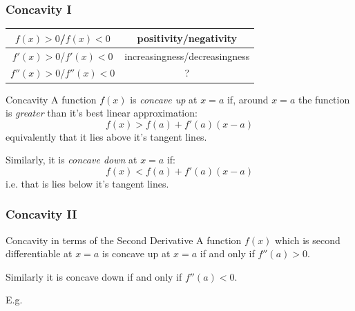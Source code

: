 \documentclass{ltx-talk}
\begin{document}
\begin{frame}
  \frametitle{Concavity I}
  
  \begin{center}
    \begin{tabular}{c|c}
      $f(x) > 0$/$f(x) < 0$ & positivity/negativity \pause \\
      \hline
      $f'(x) > 0$/$f'(x) < 0$ & increasingness/decreasingness \pause \\
      \hline
      $f''(x) > 0$/$f''(x) < 0$ & ?
    \end{tabular}
  \end{center}
    \begin{block}{Concavity}
      A function $f(x)$ is \textit{concave up} at $x = a$ if,
      around $x = a$ \pause the function is \textit{greater} than it's 
      best linear approximation: \pause
      \begin{equation}
        f(x) > f(a) + f'(a)(x - a)
      \end{equation} \pause
      equivalently that it lies above it's tangent lines. \pause

      Similarly, it is \textit{concave down} at $x = a$ if: \pause
      \begin{equation}
        f(x) < f(a) + f'(a)(x - a)
      \end{equation} \pause
      i.e. that is lies below it's tangent lines.
    \end{block}
\end{frame}
\begin{frame}
  \frametitle{Concavity II}

  \begin{alertblock}{Concavity in terms of the Second Derivative}
    A function $f(x)$ which is second differentiable at $x = a$ \pause
    is concave up at $x = a$ if and only if $f''(a) > 0$. \pause

    Similarly it is concave down if and only if $f''(a) < 0$. \pause
  \end{alertblock}

  E.g. 
  \vfill
\end{frame}
\end{document}
